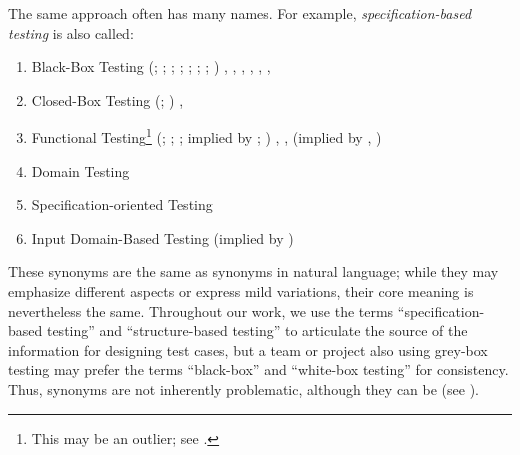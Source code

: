 The same approach often has many names. For example,
\emph{specification-based testing} is also called:
\begin{enumerate}
    \item Black-Box Testing
          \ifnotpaper
              (\citealp[p.~9]{IEEE2022}; \citeyear[p.~8]{IEEE2021};
              \citeyear[p.~431]{IEEE2017}; \citealp[p.~5\=/10]{SWEBOK2024};
              \citealpISTQB{}; \citealp[p.~46 (without hyphen)]{Firesmith2015};
              \citealp[p.~344]{SakamotoEtAl2013}; \citealp[p.~399]{vanVliet2000})
          \else
              \cite[p.~9]{IEEE2022}, \cite{ISTQB}, \cite[p.~431]{IEEE2017},
              \cite[p.~5\=/10]{SWEBOK2024}, \cite[p.~8]{IEEE2021},
              \cite[p.~399]{vanVliet2000},
              \cite[p.~344]{SakamotoEtAl2013}
          \fi
    \item Closed-Box Testing
          \ifnotpaper
              (\citealp[p.~9]{IEEE2022}; \citeyear[p.~431]{IEEE2017})
          \else
              \cite[p.~9]{IEEE2022}, \cite[p.~431]{IEEE2017}
          \fi
    \item Functional Testing\footnote{This may be an outlier; see
              .}
          \ifnotpaper
              (\citealp[p.~196]{IEEE2017}; \citealp[p.~44]{Kam2008};
              \citealp[p.~399]{vanVliet2000}; implied by
              \citealp[p.~129]{IEEE2021}; \citeyear[p.~431]{IEEE2017})
          \else
              \cite[p.~196]{IEEE2017}, \cite[p.~399]{vanVliet2000},
              \cite[p.~44]{Kam2008} (implied by \cite[p.~431]{IEEE2017},
              \cite[p.~129]{IEEE2021})
          \fi
    \item Domain Testing \citep[p.~5\=/10]{SWEBOK2024}
    \item Specification-oriented Testing \citep[p.~440, Fig.~12.2]{PetersAndPedrycz2000}
    \item Input Domain-Based Testing (implied by \citealp[pp.~4\=/7 to
              4\=/8]{SWEBOK2014})
\end{enumerate}

These synonyms are the same as synonyms in natural language; while they may
emphasize different aspects or express mild variations, their core meaning
is nevertheless the same. Throughout our work, we use the terms
``specification-based testing'' and ``structure-based testing'' to articulate
the source of the information for designing test cases, but a team or project
also using grey-box testing may prefer the terms ``black-box'' and ``white-box
testing'' for consistency. Thus, synonyms are not inherently problematic,
although they can be (see ).

